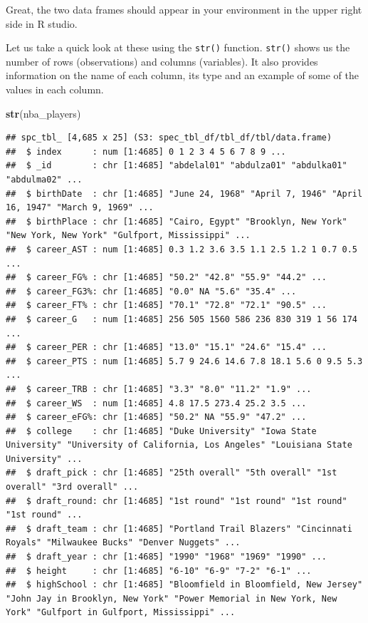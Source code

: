 \documentclass[
]{book}
\newenvironment{Shaded}{\begin{snugshade}}{\end{snugshade}}
\newcommand{\FunctionTok}[1]{\textcolor[rgb]{0.13,0.29,0.53}{\textbf{#1}}}
\newcommand{\NormalTok}[1]{#1}
\begin{document}
Great, the two data frames should appear in your environment in the upper right side in R studio.

Let us take a quick look at these using the \texttt{str()} function. \texttt{str()} shows us the number of rows (observations) and columns (variables). It also provides information on the name of each column, its type and an example of some of the values in each column.

\begin{Shaded}
\begin{Highlighting}[]
\FunctionTok{str}\NormalTok{(nba\_players)}
\end{Highlighting}
\end{Shaded}

\begin{verbatim}
## spc_tbl_ [4,685 x 25] (S3: spec_tbl_df/tbl_df/tbl/data.frame)
##  $ index      : num [1:4685] 0 1 2 3 4 5 6 7 8 9 ...
##  $ _id        : chr [1:4685] "abdelal01" "abdulza01" "abdulka01" "abdulma02" ...
##  $ birthDate  : chr [1:4685] "June 24, 1968" "April 7, 1946" "April 16, 1947" "March 9, 1969" ...
##  $ birthPlace : chr [1:4685] "Cairo, Egypt" "Brooklyn, New York" "New York, New York" "Gulfport, Mississippi" ...
##  $ career_AST : num [1:4685] 0.3 1.2 3.6 3.5 1.1 2.5 1.2 1 0.7 0.5 ...
##  $ career_FG% : chr [1:4685] "50.2" "42.8" "55.9" "44.2" ...
##  $ career_FG3%: chr [1:4685] "0.0" NA "5.6" "35.4" ...
##  $ career_FT% : chr [1:4685] "70.1" "72.8" "72.1" "90.5" ...
##  $ career_G   : num [1:4685] 256 505 1560 586 236 830 319 1 56 174 ...
##  $ career_PER : chr [1:4685] "13.0" "15.1" "24.6" "15.4" ...
##  $ career_PTS : num [1:4685] 5.7 9 24.6 14.6 7.8 18.1 5.6 0 9.5 5.3 ...
##  $ career_TRB : chr [1:4685] "3.3" "8.0" "11.2" "1.9" ...
##  $ career_WS  : num [1:4685] 4.8 17.5 273.4 25.2 3.5 ...
##  $ career_eFG%: chr [1:4685] "50.2" NA "55.9" "47.2" ...
##  $ college    : chr [1:4685] "Duke University" "Iowa State University" "University of California, Los Angeles" "Louisiana State University" ...
##  $ draft_pick : chr [1:4685] "25th overall" "5th overall" "1st overall" "3rd overall" ...
##  $ draft_round: chr [1:4685] "1st round" "1st round" "1st round" "1st round" ...
##  $ draft_team : chr [1:4685] "Portland Trail Blazers" "Cincinnati Royals" "Milwaukee Bucks" "Denver Nuggets" ...
##  $ draft_year : chr [1:4685] "1990" "1968" "1969" "1990" ...
##  $ height     : chr [1:4685] "6-10" "6-9" "7-2" "6-1" ...
##  $ highSchool : chr [1:4685] "Bloomfield in Bloomfield, New Jersey" "John Jay in Brooklyn, New York" "Power Memorial in New York, New York" "Gulfport in Gulfport, Mississippi" ...

\end{verbatim}
\end{document}
